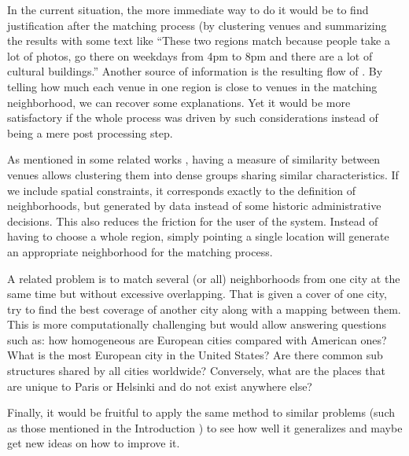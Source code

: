 In the current situation, the more immediate way to do it would be to find
justification after the matching process (by clustering venues and summarizing
the results with some text like \enquote{These two regions match because people
take a lot of photos, go there on weekdays from 4pm to 8pm and there are a
lot of cultural buildings.} Another source of information is the resulting
flow of \emd{}. By telling how much each venue in one region is close to venues
in the matching neighborhood, we can recover some explanations.  Yet it would
be more satisfactory if the whole process was driven by such considerations
instead of being a mere post processing step.

\medskip

As mentioned in some related works \autocites{Livehoods12}{Hoodsquare13},
having a measure of similarity between venues allows clustering them into
dense groups sharing similar characteristics. If we include spatial
constraints, it corresponds exactly to the definition of neighborhoods, but
generated by data instead of some historic administrative decisions. This
also reduces the friction for the user of the system. Instead of having to
choose a whole region, simply pointing a single location will generate an
appropriate neighborhood for the matching process.

A related problem is to match several (or all) neighborhoods from one city at
the same time but without excessive overlapping. That is given a cover of one
city, try to find the best coverage of another city along with a mapping
between them.  This is more computationally challenging but would allow
answering questions such as: how homogeneous are European cities compared with
American ones? What is the most European city in the United States? Are there
common sub structures shared by all cities worldwide? Conversely, what are the
places that are unique to Paris or Helsinki and do not exist anywhere else?

Finally, it would be fruitful to apply the same method to similar problems
(such as those mentioned in the Introduction ) to see
how well it generalizes and maybe get new ideas on how to improve it.
